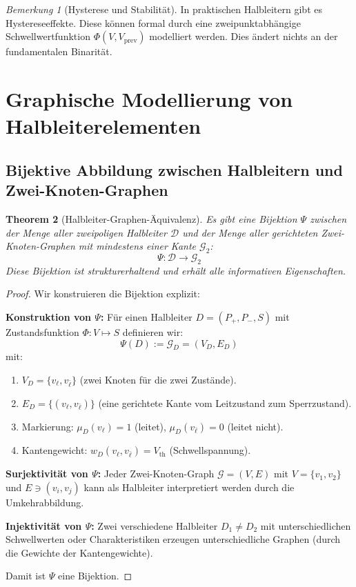 \documentclass[12pt, a4paper]{article}
\newtheorem{theorem}{Theorem}[section]
\theoremstyle{definition}
\theoremstyle{remark}
\newtheorem{remark}[theorem]{Bemerkung}
\newcommand{\Graph}{\mathcal{G}}
\newcommand{\leit}{\ell}
\newcommand{\sperr}{\bar{\ell}}
\begin{document}
\begin{remark}[Hysterese und Stabilität]
In praktischen Halbleitern gibt es Hystereseeffekte. Diese können formal durch eine zweipunktabhängige Schwellwertfunktion $\Phi(V, V_{\mathrm{prev}})$ modelliert werden. Dies ändert nichts an der fundamentalen Binarität.
\end{remark}

\section{Graphische Modellierung von Halbleiterelementen}
\label{sec:graphische_halbleiter}

\subsection{Bijektive Abbildung zwischen Halbleitern und Zwei-Knoten-Graphen}
\label{subsec:bijektion_halbleiter_graphen}

\begin{theorem}[Halbleiter-Graphen-Äquivalenz]
\label{thm:halbleiter_graphen_bijektiv}
Es gibt eine Bijektion $\Psi$ zwischen der Menge aller zweipoligen Halbleiter $\mathcal{D}$ und der Menge aller gerichteten Zwei-Knoten-Graphen mit mindestens einer Kante $\mathcal{G}_2$:
\[
  \Psi: \mathcal{D} \to \mathcal{G}_2
\]
Diese Bijektion ist strukturerhaltend und erhält alle informativen Eigenschaften.
\end{theorem}

\begin{proof}
Wir konstruieren die Bijektion explizit:

\textbf{Konstruktion von $\Psi$:} Für einen Halbleiter $D = (P_+, P_-, S)$ mit Zustandsfunktion $\Phi: V \mapsto S$ definieren wir:
\[
  \Psi(D) := \Graph_D = (V_D, E_D)
\]
mit:
\begin{enumerate}[label=(\roman*)]
  \item $V_D = \{v_{\leit}, v_{\sperr}\}$ (zwei Knoten für die zwei Zustände).
  \item $E_D = \{(v_{\leit}, v_{\sperr})\}$ (eine gerichtete Kante vom Leitzustand zum Sperrzustand).
  \item Markierung: $\mu_D(v_{\leit}) = 1$ (leitet), $\mu_D(v_{\sperr}) = 0$ (leitet nicht).
  \item Kantengewicht: $w_D(v_{\leit}, v_{\sperr}) = V_{\mathrm{th}}$ (Schwellspannung).
\end{enumerate}

\textbf{Surjektivität von $\Psi$:} Jeder Zwei-Knoten-Graph $\Graph = (V, E)$ mit $V = \{v_1, v_2\}$ und $E \ni (v_i, v_j)$ kann als Halbleiter interpretiert werden durch die Umkehrabbildung.

\textbf{Injektivität von $\Psi$:} Zwei verschiedene Halbleiter $D_1 \neq D_2$ mit unterschiedlichen Schwellwerten oder Charakteristiken erzeugen unterschiedliche Graphen (durch die Gewichte der Kantengewichte).

Damit ist $\Psi$ eine Bijektion.
\end{proof}
\end{document}
